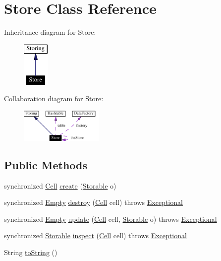 \hypertarget{classStore}{
\section{Store  Class Reference}
\label{classStore}
}
Inheritance diagram for Store:\begin{figure}[H]
\begin{center}
\leavevmode
\includegraphics[width=37pt]{classStore__inherit__graph}
\end{center}
\end{figure}
Collaboration diagram for Store:\begin{figure}[H]
\begin{center}
\leavevmode
\includegraphics[width=114pt]{classStore__coll__graph}
\end{center}
\end{figure}
\subsection*{Public Methods}
\begin{CompactItemize}
\item 
synchronized \hyperlink{interfaceCell}{Cell} \hyperlink{classStore_a0}{create} (\hyperlink{interfaceStorable}{Storable} o)
\item 
synchronized \hyperlink{interfaceEmpty}{Empty} \hyperlink{classStore_a1}{destroy} (\hyperlink{interfaceCell}{Cell} cell) throws \hyperlink{classExceptional}{Exceptional}
\item 
synchronized \hyperlink{interfaceEmpty}{Empty} \hyperlink{classStore_a2}{update} (\hyperlink{interfaceCell}{Cell} cell, \hyperlink{interfaceStorable}{Storable} o) throws \hyperlink{classExceptional}{Exceptional}
\item 
synchronized \hyperlink{interfaceStorable}{Storable} \hyperlink{classStore_a3}{inspect} (\hyperlink{interfaceCell}{Cell} cell) throws \hyperlink{classExceptional}{Exceptional}
\item 
String \hyperlink{classStore_a4}{to\-String} ()
\end{CompactItemize}
